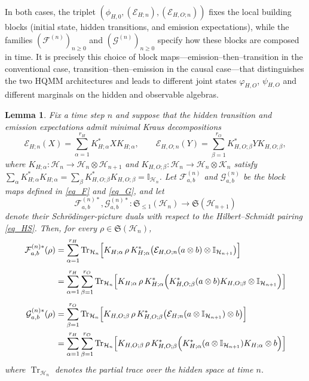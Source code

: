 \documentclass[11pt, reco]{article}
\newtheorem{lemma}[theorem]{Lemma}
\begin{document}
In both cases, the triplet \((\phi_{H,0},(\mathcal{E}_{H;n}),(\mathcal{E}_{H,O;n}))\) fixes the local building blocks (initial state, hidden transitions, and emission expectations), while the families \((\mathcal{F}^{(n)})_{n\ge 0}\) and \((\mathcal{G}^{(n)})_{n\ge 0}\) specify how these blocks are composed in time. It is precisely this choice of block maps—emission–then–transition in the conventional case, transition–then–emission in the causal case—that distinguishes the two HQMM architectures and leads to different joint states \(\varphi_{H,O}\), \(\psi_{H,O}\) and different marginals on the hidden and observable algebras.


\begin{lemma}\label{lem:dual-block-maps} 
Fix a time step $n$ and suppose that the hidden transition and emission expectations admit minimal Kraus decompositions
\[
\mathcal{E}_{H;n}(X)
=
\sum_{\alpha=1}^{r_H} K_{H;\alpha}^{*} X K_{H;\alpha},
\qquad
\mathcal{E}_{H,O;n}(Y)
=
\sum_{\beta=1}^{r_O} K_{H,O;\beta}^{*} Y K_{H,O;\beta},
\]
where $K_{H;\alpha}:\mathcal{H}_n\to\mathcal{H}_n\otimes\mathcal{H}_{n+1}$ and $K_{H,O;\beta}:\mathcal{H}_n\to\mathcal{H}_n\otimes\mathcal{K}_n$ satisfy
\(
\sum_{\alpha}K_{H;\alpha}^{*}K_{H;\alpha}
=
\sum_{\beta}K_{H,O;\beta}^{*}K_{H,O;\beta}
=
\mathbb{I}_{\mathcal{H}_n}
\).
Let $\mathcal{F}_{a,b}^{(n)}$ and $\mathcal{G}_{a,b}^{(n)}$ be the block maps defined in \eqref{eq_F} and \eqref{eq_G}, and let
\[
\mathcal{F}_{a,b}^{(n)*},\mathcal{G}_{a,b}^{(n)*}:\mathfrak{S}_{\le 1}(\mathcal{H}_n)\to\mathfrak{S}(\mathcal{H}_{n+1})
\]
denote their Schr\"odinger-picture duals with respect to the Hilbert–Schmidt pairing \eqref{eq_HS}. Then, for every $\rho\in\mathfrak{S}(\mathcal{H}_n)$,
\begin{align} \label{Fab*}
\mathcal{F}_{a,b}^{(n)*}(\rho)
&=
\sum_{\alpha=1}^{r_H}
\operatorname{Tr}_{\mathcal{H}_n}\Bigl[
K_{H;\alpha}\,\rho\,K_{H;\alpha}^{*}
\bigl(\mathcal{E}_{H,O;n}(a\otimes b)\otimes\mathbb{I}_{\mathcal{H}_{n+1}}\bigr)
\Bigr]\nonumber\\[0.4em]
&=
\sum_{\alpha=1}^{r_H}\sum_{\beta=1}^{r_O}
\operatorname{Tr}_{\mathcal{H}_n}\Bigl[
K_{H;\alpha}\,\rho\,K_{H;\alpha}^{*}
\Bigl(
 K_{H,O;\beta}^{*}(a\otimes b)K_{H,O;\beta}
\otimes\mathbb{I}_{\mathcal{H}_{n+1}}
\Bigr)
\Bigr]\\[0.4em]
\label{Gab*}\mathcal{G}_{a,b}^{(n)*}(\rho)
&=
\sum_{\beta=1}^{r_O}
\operatorname{Tr}_{\mathcal{H}_n}\Bigl[
K_{H,O;\beta}\,\rho\,K_{H,O;\beta}^{*}
\bigl(\mathcal{E}_{H;n}(a\otimes\mathbb{I}_{\mathcal{H}_{n+1}})\otimes b\bigr)
\Bigr]\nonumber\\
&=
\sum_{\alpha=1}^{r_H}\sum_{\beta=1}^{r_O}
\operatorname{Tr}_{\mathcal{H}_n}\Bigl[
K_{H,O;\beta}\,\rho\,K_{H,O;\beta}^{*}
\Bigl(
K_{H;\alpha}^{*}(a\otimes\mathbb{I}_{\mathcal{H}_{n+1}})K_{H;\alpha}
\otimes b
\Bigr)
\Bigr]
\end{align}
where $\operatorname{Tr}_{\mathcal{H}_n}$ denotes the partial trace over the hidden space at time $n$.
\end{lemma}
\end{document}
